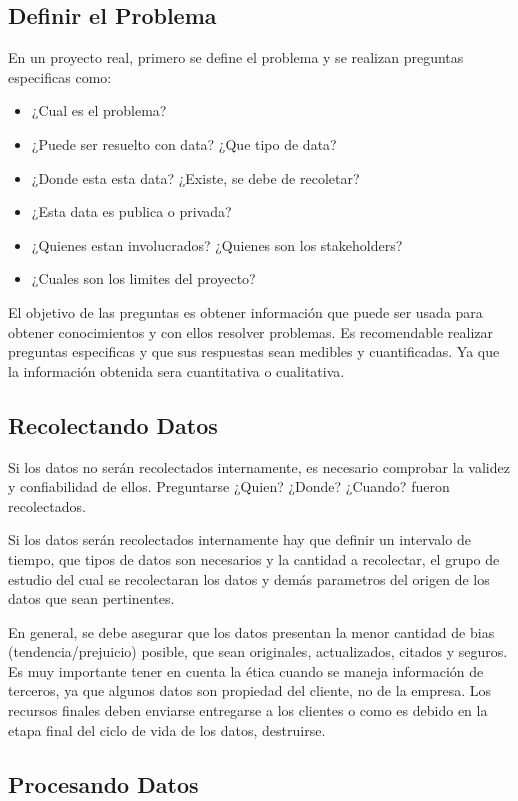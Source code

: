 \documentclass[12pt,a4paper,openright]{article}
\begin{document}
\subsection{Definir el Problema}
En un proyecto real, primero se define el problema y se realizan preguntas especificas como:
\begin{itemize}
    \item ¿Cual es el problema?
    \item ¿Puede ser resuelto con data? ¿Que tipo de data?
    \item ¿Donde esta esta data? ¿Existe, se debe de recoletar?
    \item ¿Esta data es publica o privada?
    \item ¿Quienes estan involucrados? ¿Quienes son los stakeholders?
    \item ¿Cuales son los limites del proyecto?
\end{itemize}

El objetivo de las preguntas es obtener informaci\'on que puede ser usada para obtener conocimientos y con ellos resolver problemas. Es recomendable realizar preguntas especificas y que sus respuestas sean medibles y cuantificadas. Ya que la información obtenida sera cuantitativa o cualitativa.

\subsection{Recolectando Datos}
Si los datos no serán recolectados internamente, es necesario comprobar la validez y confiabilidad de ellos. Preguntarse ¿Quien? ¿Donde? ¿Cuando? fueron recolectados.

Si los datos serán recolectados internamente hay que definir un intervalo de tiempo, que tipos de datos son necesarios y la cantidad a recolectar, el grupo de estudio del cual se recolectaran los datos y dem\'as parametros del origen de los datos que sean pertinentes.

En general, se debe asegurar que los datos presentan la menor cantidad de bias (tendencia/prejuicio) posible, que sean originales, actualizados, citados y seguros. Es muy importante tener en cuenta la \'etica cuando se maneja informaci\'on de terceros, ya que algunos datos son propiedad del cliente, no de la empresa. Los recursos finales deben enviarse entregarse a los clientes o como es debido en la etapa final del ciclo de vida de los datos, destruirse.

\subsection{Procesando Datos}
\end{document}
